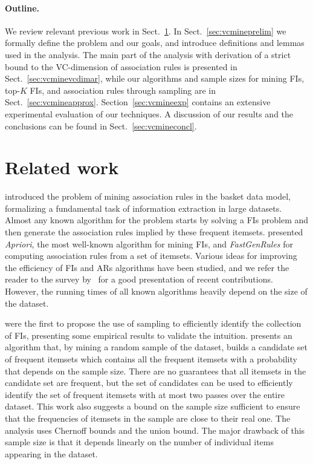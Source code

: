 \paragraph{Outline.}
We review relevant previous work in Sect.~\ref{sec:vcmineprevwork}. In
Sect.~\ref{sec:vcmineprelim} we formally define the problem
and our goals, and introduce definitions and lemmas used in the analysis. The
main part of the analysis with derivation of a strict bound to the VC-dimension
of association rules is presented in Sect.~\ref{sec:vcminevcdimar}, while our
algorithms and sample sizes for mining FIs, top-$K$ FIs, and association rules
through sampling are in Sect.~\ref{sec:vcmineapprox}. Section~\ref{sec:vcmineexp} contains
an extensive experimental evaluation of our techniques. A discussion of our
results and the conclusions can be found in Sect.~\ref{sec:vcmineconcl}.

\section{Related work}\label{sec:vcmineprevwork}
\citet{AgrawalIS93} introduced the problem of mining association
rules in the basket data model, formalizing a fundamental task of information
extraction in large datasets. Almost any known algorithm for the problem starts
by solving a FIs problem and then generate the association rules implied by
these frequent itemsets. \citet{AgrawalS94} presented
\emph{Apriori}, the most well-known algorithm for mining FIs, and
\emph{FastGenRules} for computing association rules from a set of itemsets.
Various ideas for improving the efficiency of FIs and ARs algorithms have been
studied, and we refer the reader to the survey by~\citet{CeglarR06} for a good presentation of recent contributions.
However, the running times of all known algorithms heavily depend on the size of
the dataset.  

\citet{MannilaTV94} were the first to propose the 
use of sampling to efficiently identify the collection of FIs, presenting some empirical
results to validate the intuition. \citet{Toivonen96} presents an
algorithm that, by mining a random sample of the dataset, builds a candidate set
of frequent itemsets which contains all the frequent itemsets with a probability
that depends on the sample size. There are no guarantees that all itemsets
in the candidate set are frequent, but the set of candidates can be used to
efficiently identify the set of frequent itemsets with at most two passes over
the entire dataset. This work also suggests a bound on the sample size sufficient
to ensure that the frequencies of itemsets in the sample are close to their real
one. The analysis uses Chernoff bounds and the union bound. The major drawback
of this sample size is that it depends linearly on the number of individual
items appearing in the dataset.

